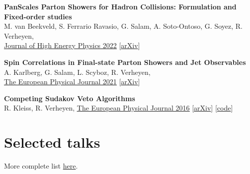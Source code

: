 \documentclass[a4paper,12pt]{article}
\begin{document}
\textbf{PanScales Parton Showers for Hadron Collisions: Formulation and Fixed-order studies} \\
M. van Beekveld, S. Ferrario Ravasio, G. Salam, A. Soto-Ontoso, G. Soyez, R. Verheyen, \\
\href{https://arxiv.org/abs/2205.02237}{\underline{Journal of High Energy Physics 2022}} [\href{https://arxiv.org/abs/2205.02237}{arXiv}]

\textbf{Spin Correlations in Final-state Parton Showers and Jet Observables} \\
A. Karlberg, G. Salam, L. Scyboz, R. Verheyen, \\
\href{https://link.springer.com/article/10.1140/epjc/s10052-021-09378-0}{\underline{The European Physical Journal 2021}} [\href{https://arxiv.org/pdf/2103.16526.pdf}{arXiv}]

\textbf{Competing Sudakov Veto Algorithms} \\
R. Kleiss, R. Verheyen,
\href{https://link.springer.com/article/10.1140/epjc/s10052-016-4231-5}{\underline{The European Physical Journal 2016}} [\href{https://arxiv.org/pdf/1605.09246.pdf}{arXiv}] [\href{https://github.com/rbvh/Veto-Algorithm-Toy-Shower}{code}]



\section{Selected talks}
More complete list \href{https://rbvh.github.io/}{here}.
\end{document}
